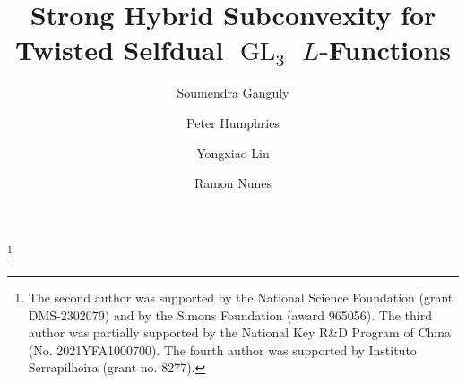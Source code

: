 \documentclass[11pt,a4paper]{amsart}
\DeclareMathOperator{\GL}{GL}
\numberwithin{equation}{section}
\theoremstyle{remark}
\theoremstyle{definition}
\begin{document}
\title{Strong Hybrid Subconvexity for Twisted Selfdual $\GL_3$ $L$-Functions}


\author{Soumendra Ganguly}

\address{Department of Mathematics, Aarhus University, Ny Munkegade 118, 8000 Aarhus C, Denmark}




\author{Peter Humphries}

\address{Department of Mathematics, University of Virginia, Charlottesville, VA 22904, USA}




\author{Yongxiao Lin}


\address{Data Science Institute, Shandong University, Jinan 250100, China; State Key Laboratory of Cryptography and Digital Economy Security, Shandong University, Jinan 250100, China}




\author{Ramon Nunes}

\address{Departamento de Matem\'{a}tica, Universidade Federal do Cear\'{a}, Campus do Pici, Bloco 914, 60440-900 Fortaleza-CE, Brasil}






\thanks{The second author was supported by the National Science Foundation (grant DMS-2302079) and by the Simons Foundation (award 965056). The third author was partially supported by the National Key R\&D Program of China (No. 2021YFA1000700). The fourth author was supported by Instituto Serrapilheira (grant no. 8277).}
\end{document}
